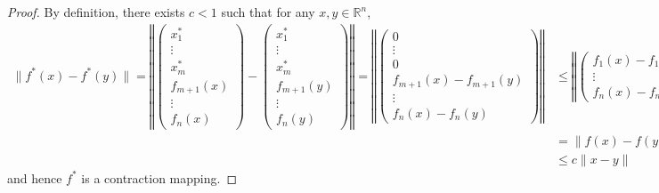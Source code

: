 \begin{proof}
By definition, there exists $c < 1$ such that for any $x,y\in \mathbb{R}^n$,
\begin{align*}
\| f^*(x) - f^*(y) \| =
\left\Vert
\begin{pmatrix}x^*_1\\ \vdots \\ x^*_m \\ f_{m+1}(x) \\ \vdots \\ f_n(x) \end{pmatrix} - \begin{pmatrix}x^*_1\\ \vdots \\ x^*_m \\ f_{m+1}(y) \\ \vdots \\ f_n(y) \end{pmatrix} \right\Vert =
\left\Vert
\begin{pmatrix} 0 \\ \vdots \\ 0 \\ f_{m+1}(x) - f_{m+1}(y) \\ \vdots \\ f_{n}(x) - f_n(y) \end{pmatrix} \right\Vert &\leq
\left\Vert
\begin{pmatrix} f_{1}(x) - f_1(y)  \\ \vdots \\ f_{n}(x) - f_n(y) \end{pmatrix} \right\Vert \\
& = \| f(x)-f(y) \|    \\
&\leq c \| x - y \|
\end{align*}
and hence $f^*$ is a contraction mapping.
\end{proof}



